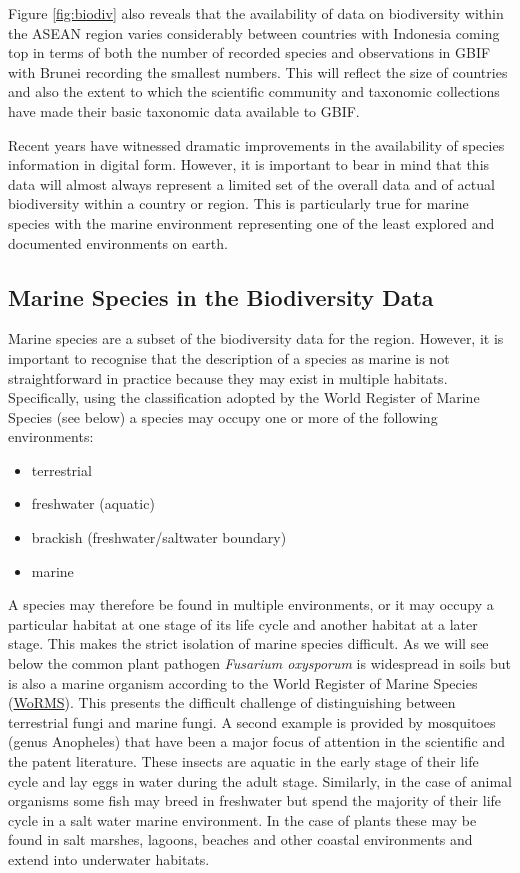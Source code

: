\documentclass[]{book}
\providecommand{\tightlist}{%
  \setlength{\itemsep}{0pt}\setlength{\parskip}{0pt}}
\theoremstyle{definition}
\theoremstyle{definition}
\theoremstyle{definition}
\theoremstyle{remark}
\begin{document}
Figure \ref{fig:biodiv} also reveals that the availability of data on
biodiversity within the ASEAN region varies considerably between
countries with Indonesia coming top in terms of both the number of
recorded species and observations in GBIF with Brunei recording the
smallest numbers. This will reflect the size of countries and also the
extent to which the scientific community and taxonomic collections have
made their basic taxonomic data available to GBIF.

Recent years have witnessed dramatic improvements in the availability of
species information in digital form. However, it is important to bear in
mind that this data will almost always represent a limited set of the
overall data and of actual biodiversity within a country or region. This
is particularly true for marine species with the marine environment
representing one of the least explored and documented environments on
earth.

\hypertarget{marine-species-in-the-biodiversity-data}{%
\subsection{Marine Species in the Biodiversity
Data}\label{marine-species-in-the-biodiversity-data}}

Marine species are a subset of the biodiversity data for the region.
However, it is important to recognise that the description of a species
as marine is not straightforward in practice because they may exist in
multiple habitats. Specifically, using the classification adopted by the
World Register of Marine Species (see below) a species may occupy one or
more of the following environments:

\begin{itemize}
\tightlist
\item
  terrestrial
\item
  freshwater (aquatic)
\item
  brackish (freshwater/saltwater boundary)
\item
  marine
\end{itemize}

A species may therefore be found in multiple environments, or it may
occupy a particular habitat at one stage of its life cycle and another
habitat at a later stage. This makes the strict isolation of marine
species difficult. As we will see below the common plant pathogen
\emph{Fusarium oxysporum} is widespread in soils but is also a marine
organism according to the World Register of Marine Species
(\href{http://www.marinespecies.org/aphia.php?p=taxdetails\&id=100523}{WoRMS}).
This presents the difficult challenge of distinguishing between
terrestrial fungi and marine fungi. A second example is provided by
mosquitoes (genus Anopheles) that have been a major focus of attention
in the scientific and the patent literature. These insects are aquatic
in the early stage of their life cycle and lay eggs in water during the
adult stage. Similarly, in the case of animal organisms some fish may
breed in freshwater but spend the majority of their life cycle in a salt
water marine environment. In the case of plants these may be found in
salt marshes, lagoons, beaches and other coastal environments and extend
into underwater habitats.
\end{document}
